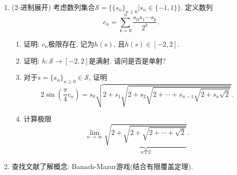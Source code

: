 \documentclass[UTF8,11pt, a4paper, oneside, fontset=none]{ctexbook}
\begin{document}
\begin{enumerate}
\begin{enumerate}
\item 证明: 相邻渐进分数之差满足:
\[
\frac{p_n}{q_n} - \frac{p_{n-1}}{q_{n-1}} = \frac{(-1)^{n+1}}{q_{n-1}q_n}, \forall n \geq 1.
\]

\item 证明: $\lim_{n \to \infty} \frac{p_n}{q_n}$极限存在, 定义为无限连分数的值, 记为$\alpha$.

\item 证明: $\alpha$是无理数.

\item 证明: 
\[
\frac{p_0}{q_0} < \frac{p_2}{q_2} < \cdots \frac{p_{2n}}{q_{2n}} < \cdots < \alpha < \cdots < \frac{p_{2n+1}}{q_{2n+1}} < \cdots < \frac{p_3}{q_3} < \frac{p_1}{q_1}.
\]

\item 将$\frac{1 + \sqrt 5}{2}$展开为无限连分数. 这个无理数的渐进分数分母恰为Fibonacci数列. 尝试推到该数列的通项公式.

\item 证明: 当$n \geq 0$时,
\[
\frac{1}{q_n(q_n + q_{n+1})} < \Big| \alpha - \frac{p_n}{q_n} \Big| < \frac{1}{q_n q_{n+1}}.
\]

\item 证明:
\[
|q_0 \alpha - p_0| > |q_1 \alpha - p_1| > \cdots > |q_n \alpha - p_n| > \cdots.
\]

\item 证明: 若$p, q$为正整数使得
\[
|q \alpha -p| < |q_n \alpha -p_n|,
\]
则$q \geq q_{n+1}$对某个$n \geq 0$成立.

\end{enumerate}


\item (2-进制展开) 考虑数列集合$\mathcal S = \{ \{s_n \}_{n \geq 0} \Big| s_n \in \{-1, 1 \} \}$. 定义数列
\[
c_n = \sum_{k=0}^n \frac{s_0 s_1 \cdots s_k}{2^k}.
\]

\begin{enumerate}

\item 证明: $c_n$极限存在, 记为$h(s)$, 且$h(s) \in [-2, 2]$.

\item 证明: $h : \mathcal S \to [-2, 2]$是满射. 请问是否是单射?

\item 对于$s = \{ s_n\}_{n \geq 0} \in \mathcal S$, 证明
\[
2 \sin\left( \frac{\pi}{4} c_n \right)= s_0 \sqrt{2 + s_1 \sqrt{2 + s_2 \sqrt{2 + \cdots + s_{n-1} \sqrt{2 + s_n \sqrt2}}}}.
\]

\item 计算极限
\[
\lim_{n \to \infty} \underbrace{\sqrt{2 + \sqrt{2 + \sqrt{2 + \cdots + \sqrt 2}}}}_{\text{$n$个2}}.
\]

\end{enumerate}

\item 查找文献了解概念: Banach-Mazur游戏(结合有限覆盖定理).


\end{enumerate}
\end{document}
